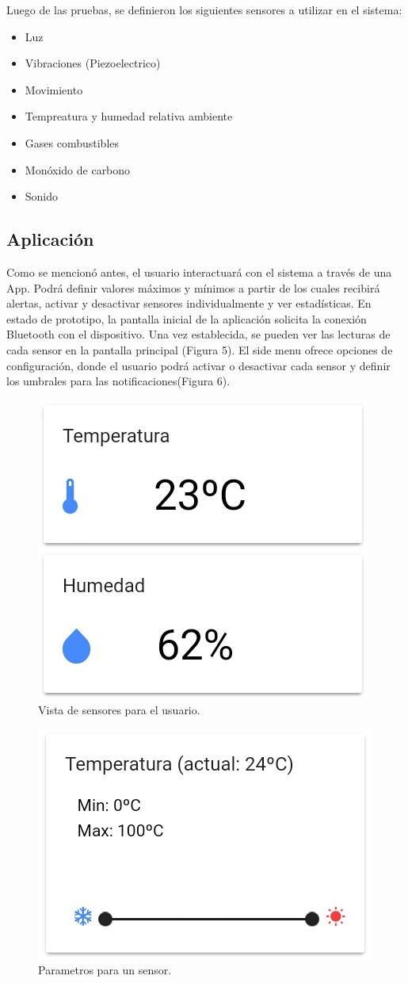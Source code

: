 \documentclass{IEEEtran}
\begin{document}
Luego de las pruebas, se definieron los siguientes sensores a utilizar en el sistema:

			\begin{itemize}
				\item Luz
				\item Vibraciones (Piezoelectrico)
				\item Movimiento
				\item Tempreatura y humedad relativa ambiente
				\item Gases combustibles
				\item Monóxido de carbono
				\item Sonido
			\end{itemize}


\subsection{Aplicación}

Como se mencionó antes, el usuario interactuará con el sistema a través de una App. Podrá definir valores máximos y mínimos a partir de los cuales recibirá alertas, activar y desactivar sensores individualmente y ver estadísticas.
En estado de prototipo, la pantalla inicial de la aplicación solicita la conexión Bluetooth con el dispositivo. Una vez establecida, se pueden ver las lecturas de cada sensor en la pantalla principal (Figura 5).
El side menu ofrece opciones de configuración, donde el usuario podrá activar o desactivar cada sensor y definir los umbrales para las notificaciones(Figura 6).


			\begin{figure}[h]
				\centering
				\includegraphics[width=0.3\linewidth]{lecturas_cortadas.png}
				\caption{Vista de sensores para el usuario.}
				\label{Vista de sensores para el usuario.}
			\end{figure}

			\begin{figure}[h]
				\centering
				\includegraphics[width=0.5\linewidth]{parametros_cortada.png}
				\caption{Parametros para un sensor.}
				\label{Parametros para un sensor.}
			\end{figure}
\end{document}
